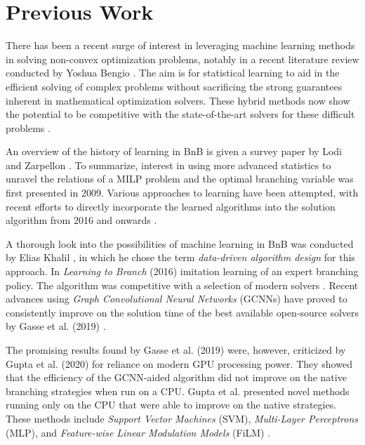 \section{Previous Work}\label{sec:int_previouswork}

There has been a recent surge of interest in leveraging machine learning methods in solving non-convex optimization problems, notably in a recent literature review conducted by Yoshua Bengio \cite{bengio2020machine}. The aim is for statistical learning to aid in the efficient solving of complex problems without sacrificing the strong guarantees inherent in mathematical optimization solvers. These hybrid methods now show the potential to be competitive with the state-of-the-art solvers for these difficult problems \cite{gasse2019exact}. 

An overview of the history of learning in \gls{BnB} is given a survey paper by Lodi and Zarpellon \cite{lodi2017learning}. To summarize, interest in using more advanced statistics to unravel the relations of a \gls{MILP} problem and the optimal branching variable was first presented in 2009. Various approaches to learning have been attempted, with recent efforts to directly incorporate the learned algorithms into the solution algorithm from 2016 and onwards \cite{lodi2017learning}.  

A thorough look into the possibilities of machine learning in \gls{BnB} was conducted by Elias Khalil \cite{khalil2020towards}, in which he chose the term \textit{data-driven algorithm design} for this approach. 
In \textit{Learning to Branch} (2016) \cite{khalil2016learning} imitation learning of an expert branching policy. The algorithm was competitive with a selection of modern solvers \cite{khalil2016learning}. 
Recent advances using\textit{ Graph Convolutional Neural Networks} (\Gls{GCNN}s) have proved to consistently improve on the solution time of the best available open-source solvers by Gasse et al. (2019) \cite{gasse2019exact}. 

The promising results found by Gasse et al. (2019) \cite{gasse2019exact} were, however, criticized by Gupta et al. (2020) \cite{gupta2020hybrid} for reliance on modern \gls{GPU} processing power. They showed that the efficiency of the \gls{GCNN}-aided algorithm did not improve on the native branching strategies when run on a \gls{CPU}. Gupta et al. presented novel methods running only on the \gls{CPU} that were able to improve on the native strategies. These methods include \textit{Support Vector Machines} (\Gls{SVM}), \textit{Multi-Layer Perceptrons} (\Gls{MLP}), and  \textit{Feature-wise Linear Modulation Models} (\gls{FiLM}) \cite{gupta2020hybrid}. 

